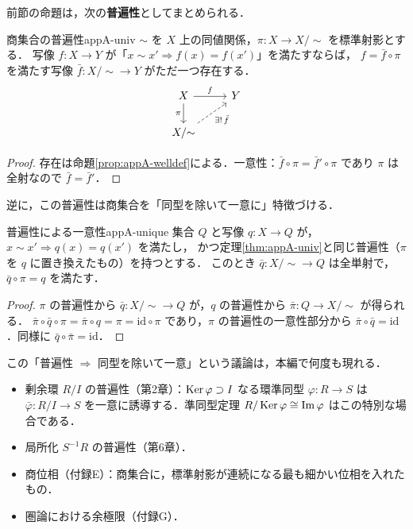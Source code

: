 前節の命題は，次の\textbf{普遍性}としてまとめられる．

\begin{mythm}{商集合の普遍性}{appA-univ}
$\sim$ を $X$ 上の同値関係，$\pi\colon X\to X/{\sim}$ を標準射影とする．
写像 $f\colon X\to Y$ が「$x\sim x'\Rightarrow f(x)=f(x')$」を満たすならば，
$f=\bar f\circ\pi$ を満たす写像 $\bar f\colon X/{\sim}\to Y$ がただ一つ存在する．
\[
\begin{tikzcd}
X \arrow[r,"f"] \arrow[d,"\pi"'] & Y\\
X/{\sim} \arrow[ru,dashed,"\exists!\,\bar f"'] &
\end{tikzcd}
\]
\end{mythm}
\begin{proof}
存在は命題\ref{prop:appA-welldef}による．一意性：$\bar f\circ\pi=\bar f'\circ\pi$ であり $\pi$ は全射なので $\bar f=\bar f'$．
\end{proof}

逆に，この普遍性は商集合を「同型を除いて一意に」特徴づける．

\begin{myprop}{普遍性による一意性}{appA-unique}
集合 $Q$ と写像 $q\colon X\to Q$ が，$x\sim x'\Rightarrow q(x)=q(x')$ を満たし，
かつ定理\ref{thm:appA-univ}と同じ普遍性（$\pi$ を $q$ に置き換えたもの）を持つとする．
このとき $\bar q\colon X/{\sim}\to Q$ は全単射で，$\bar q\circ\pi=q$ を満たす．
\end{myprop}
\begin{proof}
$\pi$ の普遍性から $\bar q\colon X/{\sim}\to Q$ が，$q$ の普遍性から $\bar\pi\colon Q\to X/{\sim}$ が得られる．
$\bar\pi\circ\bar q\circ\pi=\bar\pi\circ q=\pi=\mathrm{id}\circ\pi$ であり，$\pi$ の普遍性の一意性部分から
$\bar\pi\circ\bar q=\mathrm{id}$．同様に $\bar q\circ\bar\pi=\mathrm{id}$．
\end{proof}

この「普遍性 $\Rightarrow$ 同型を除いて一意」という議論は，本編で何度も現れる．
\begin{itemize}
\item 剰余環 $R/I$ の普遍性（第2章）：$\operatorname{Ker}\varphi\supset I$ なる環準同型 $\varphi\colon R\to S$ は
$\bar\varphi\colon R/I\to S$ を一意に誘導する．準同型定理 $R/\operatorname{Ker}\varphi\cong\operatorname{Im}\varphi$ はこの特別な場合である．
\item 局所化 $S^{-1}R$ の普遍性（第6章）．
\item 商位相（付録E）：商集合に，標準射影が連続になる最も細かい位相を入れたもの．
\item 圏論における余極限（付録G）．
\end{itemize}

